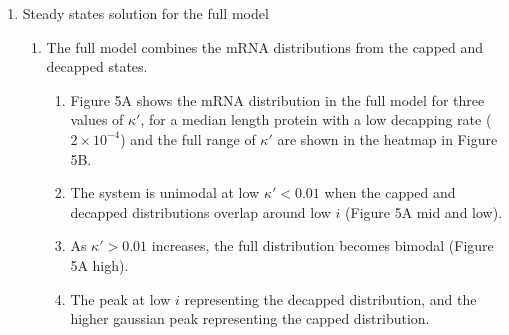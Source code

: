 \documentclass[review]{elsarticle}
\begin{document}
\begin{enumerate}
\begin{enumerate}
  \item Steady states solution for the full model
  \begin{enumerate}
    \item The full model combines the mRNA distributions from the capped and decapped states.
    \begin{enumerate}
      \item Figure 5A shows the mRNA distribution in the full model for three values of $\kappa'$, for a median length protein with a low decapping rate ($2\times10^{-4}$) and the full range of $\kappa'$ are shown in the heatmap in Figure 5B.
      \item The system is unimodal at low $\kappa'<0.01$ when the capped and decapped distributions overlap around low $i$ (Figure 5A mid and low). 
      \item As $\kappa'>0.01$ increases, the full distribution becomes bimodal (Figure 5A high).
      \item The peak at low $i$ representing the decapped distribution, and the higher gaussian peak representing the capped distribution. 
    \end{enumerate}
  \end{enumerate}

\end{enumerate}

\end{enumerate}
\end{document}

